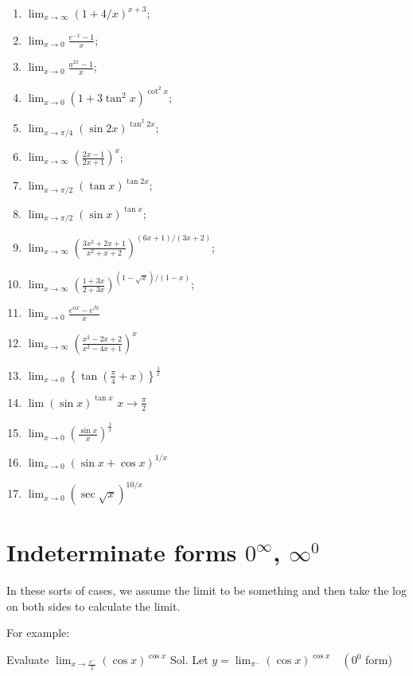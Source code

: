 \begin{enumerate}
    \item  $\lim _{x \rightarrow \infty}(1+4 / x)^{x+3}$;
\item $\lim _{x \rightarrow 0} \frac{e^{-x}-1}{x}$;
\item $\lim _{x \rightarrow 0} \frac{a^{2 x}-1}{x}$;
\item $\lim _{x \rightarrow 0}\left(1+3 \tan ^2 x\right)^{\cot ^2 x}$;
\item $\lim _{x \rightarrow \pi / 4}(\sin 2 x)^{\tan ^2 2 x}$;
\item $\lim _{x \rightarrow \infty}\left(\frac{2 x-1}{2 x+1}\right)^x$;
\item $\lim _{x \rightarrow \pi / 2}(\tan x)^{\tan 2 x}$;
\item $\lim _{x \rightarrow \pi / 2}(\sin x)^{\tan x}$;
\item $\lim _{x \rightarrow \infty}\left(\frac{3 x^2+2 x+1}{x^2+x+2}\right)^{(6 x+1) /(3 x+2)}$;
\item $\lim _{x \rightarrow \infty}\left(\frac{1+3 x}{2+3 x}\right)^{(1-\sqrt{x}) /(1-x)}$;
\item $\lim _{x \rightarrow 0} \frac{e^{\alpha x}-e^{\beta x}}{x}$
\item $\lim _{x \rightarrow \infty}\left(\frac{x^2-2 x+2}{x^2-4 x+1}\right)^x$
\item $\lim _{x \rightarrow 0}\left\{\tan \left(\frac{\pi}{4}+x\right)\right\}^{\frac{1}{x}}$
\item $\lim (\sin x)^{\tan x}$ $x \rightarrow \frac{\pi}{2}$
\item $\lim _{x \rightarrow 0}\left(\frac{\sin x}{x}\right)^{\frac{1}{x}}$
\item $\lim _{x \rightarrow 0}(\sin x+\cos x)^{1 / x}$
\item $\lim _{x \rightarrow 0}(\sec \sqrt{  x})^{10 / x}$
\end{enumerate}


\section{Indeterminate forms $0^\infty$, $\infty^0$}

In these sorts of cases, we assume the limit to be something and then take the log on both sides to calculate the limit.

For example:

Evaluate $\lim _{x \rightarrow \frac{\pi^{-}}{2}}(\cos x)^{\cos x}$
Sol. Let $y=\lim _{\pi^{-}}(\cos x)^{\cos x} \quad\left(0^0\right.$ form)
$$

